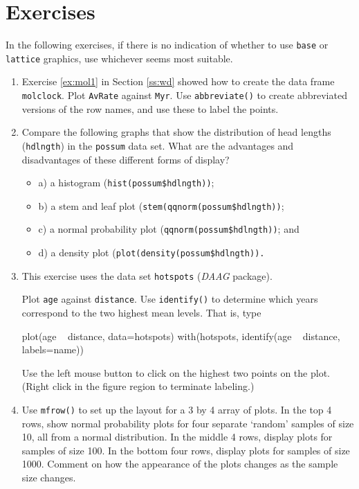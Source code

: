\documentclass{tufte-book}\usepackage[]{graphicx}\usepackage[]{color}
\newcommand{\txtt}[1]{\texttt{#1}}
\newenvironment{itemizz}%
  {\begin{itemize} %
    \setlength{\itemsep}{2pt}%
    \setlength{\parskip}{2pt}} %
  {\end{itemize}}
\begin{document}
\section{Exercises}\label{sec:plot}
In the following exercises, if there is no indication of whether to
use \txtt{base} or \txtt{lattice} graphics, use whichever seems
most suitable.

\begin{enumerate}
\item Exercise \ref{ex:mol1} in Section \ref{ss:wd} showed how to
create the data frame \txtt{molclock}.  Plot \txtt{AvRate}
  against \txtt{Myr}. Use \txtt{abbreviate()} to create abbreviated
  versions of the row names, and use these to label the
  points.\label{ex:molclock}

\item Compare the following graphs that show the distribution of head
  lengths (\txtt{hdlngth}) in the \txtt{possum} data set.
What are the advantages and disadvantages of these different
forms of display?
\begin{itemizz}
\item[] a) a histogram (\txtt{hist(possum\$hdlngth))};

\item[] b) a stem and leaf plot (\txtt{stem(qqnorm(possum\$hdlngth))};

\item[] c) a normal probability plot (\txtt{qqnorm(possum\$hdlngth))};
and

\item[] d) a density plot (\txtt{plot(density(possum\$hdlngth)).}
\end{itemizz}

\item This exercise uses the data set \txtt{hotspots}
  (\textit{DAAG} package).

Plot \txtt{age} against \txtt{distance}.  Use \txtt{identify()} to
determine which years correspond to the two highest mean levels. That
is, type
\begin{Schunk}
\begin{Sinput}
plot(age ~ distance, data=hotspots)
with(hotspots, identify(age ~ distance, labels=name))
\end{Sinput}
\end{Schunk}
Use the left mouse button to click on the highest two points
on the plot. (Right click in the figure region to terminate labeling.)

\item Use \txtt{mfrow()} to set up the layout for a 3 by 4 array
of plots. In the top 4 rows, show normal probability plots
for four separate `random' samples of size 10, all from
a normal distribution. In the middle 4 rows, display plots for
samples of size 100. In the bottom four rows, display plots for
samples of size 1000. Comment on how the appearance of the plots
changes as the sample size changes.


\end{enumerate}
\end{document}
